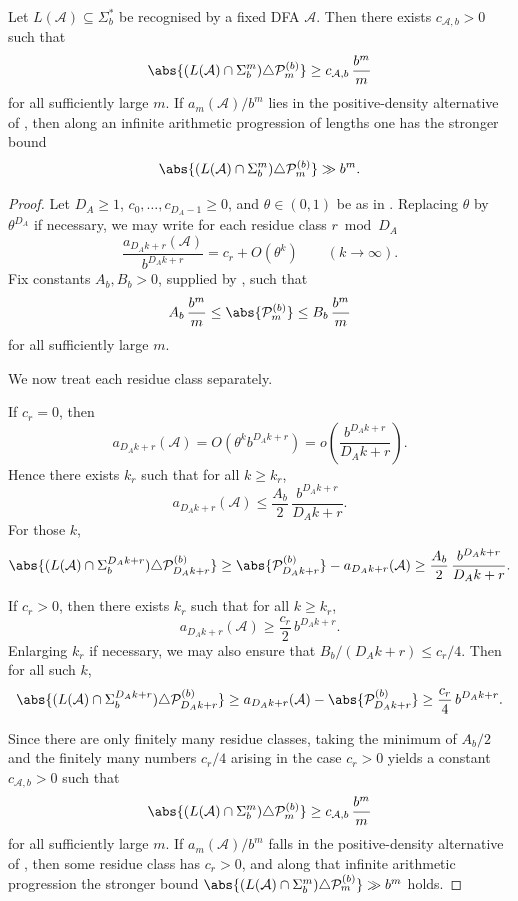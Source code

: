 \begin{corollary}
  \label{cor:dfa-prime-symmetric-diff}
  Let \(L(\mathcal A)\subseteq\Sigma_b^\ast\) be recognised by a fixed
  DFA \(\mathcal A\). Then there exists \(c_{\mathcal A,b}>0\) such that
  \[
    \abs{(L(\mathcal A)\cap\Sigma_b^m)\triangle \mathcal P_m^{(b)}}
    \ge c_{\mathcal A,b}\,\frac{b^m}{m}
  \]
  for all sufficiently large \(m\). If \(a_m(\mathcal A)/b^m\) lies in
  the positive-density alternative of ,
  then along an infinite arithmetic progression of lengths one has the
  stronger bound
  \[
    \abs{(L(\mathcal A)\cap\Sigma_b^m)\triangle \mathcal P_m^{(b)}}\gg b^m.
  \]
\end{corollary}

\begin{proof}
  Let \(D_A\ge 1\), \(c_0,\dots,c_{D_A-1}\ge 0\), and \(\theta\in(0,1)\) be
  as in . Replacing \(\theta\) by
  \(\theta^{D_A}\) if necessary, we may write for each residue class
  \(r\bmod D_A\)
  \[
    \frac{a_{D_Ak+r}(\mathcal A)}{b^{D_Ak+r}}=c_r+O(\theta^k)
    \qquad (k\to\infty).
  \]
  Fix constants \(A_b,B_b>0\), supplied by
  , such that
  \[
    A_b\,\frac{b^m}{m}\le \abs{\mathcal P_m^{(b)}}\le B_b\,\frac{b^m}{m}
  \]
  for all sufficiently large \(m\).

  We now treat each residue class separately.

  If \(c_r=0\), then
  \[
    a_{D_Ak+r}(\mathcal A)=O(\theta^k b^{D_Ak+r})
    =o\!\left(\frac{b^{D_Ak+r}}{D_Ak+r}\right).
  \]
  Hence there exists \(k_r\) such that for all \(k\ge k_r\),
  \[
    a_{D_Ak+r}(\mathcal A)
    \le \frac{A_b}{2}\,\frac{b^{D_Ak+r}}{D_Ak+r}.
  \]
  For those \(k\),
  \[
    \abs{(L(\mathcal A)\cap\Sigma_b^{D_Ak+r})\triangle \mathcal P_{D_Ak+r}^{(b)}}
    \ge \abs{\mathcal P_{D_Ak+r}^{(b)}}-a_{D_Ak+r}(\mathcal A)
    \ge \frac{A_b}{2}\,\frac{b^{D_Ak+r}}{D_Ak+r}.
  \]

  If \(c_r>0\), then there exists \(k_r\) such that for all \(k\ge k_r\),
  \[
    a_{D_Ak+r}(\mathcal A)\ge \frac{c_r}{2}\,b^{D_Ak+r}.
  \]
  Enlarging \(k_r\) if necessary, we may also ensure that
  \(B_b/(D_Ak+r)\le c_r/4\). Then for all such \(k\),
  \[
    \abs{(L(\mathcal A)\cap\Sigma_b^{D_Ak+r})\triangle \mathcal P_{D_Ak+r}^{(b)}}
    \ge a_{D_Ak+r}(\mathcal A)-\abs{\mathcal P_{D_Ak+r}^{(b)}}
    \ge \frac{c_r}{4}\,b^{D_Ak+r}.
  \]

  Since there are only finitely many residue classes, taking the minimum
  of \(A_b/2\) and the finitely many numbers \(c_r/4\) arising in the
  case \(c_r>0\) yields a constant \(c_{\mathcal A,b}>0\) such that
  \[
    \abs{(L(\mathcal A)\cap\Sigma_b^m)\triangle \mathcal P_m^{(b)}}
    \ge c_{\mathcal A,b}\,\frac{b^m}{m}
  \]
  for all sufficiently large \(m\). If \(a_m(\mathcal A)/b^m\) falls in
  the positive-density alternative of ,
  then some residue class has \(c_r>0\), and along that infinite
  arithmetic progression the stronger bound
  \(\abs{(L(\mathcal A)\cap\Sigma_b^m)\triangle \mathcal P_m^{(b)}}\gg b^m\)
  holds.
\end{proof}

